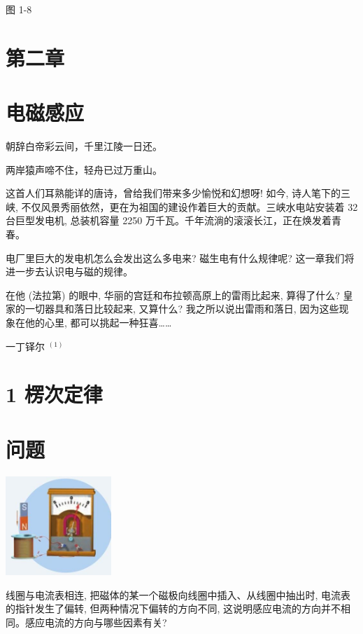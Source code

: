 \documentclass[10pt]{article}
\begin{document}
图 1-8

\section*{第二章}

\section*{电磁感应}

朝辞白帝彩云间，千里江陵一日还。

两岸猿声啼不住，轻舟已过万重山。

这首人们耳熟能详的唐诗，曾给我们带来多少愉悦和幻想呀! 如今, 诗人笔下的三峡, 不仅风景秀丽依然，更在为祖国的建设作着巨大的贡献。三峡水电站安装着 32 台巨型发电机, 总装机容量 2250 万千瓦。千年流淌的滚滚长江，正在焕发着青春。

电厂里巨大的发电机怎么会发出这么多电来? 磁生电有什么规律呢? 这一章我们将进一步去认识电与磁的规律。

在他 (法拉第) 的眼中, 华丽的宫廷和布拉顿高原上的雷雨比起来, 算得了什么? 皇家的一切器具和落日比较起来, 又算什么? 我之所以说出雷雨和落日, 因为这些现象在他的心里, 都可以挑起一种狂喜……

一丁铎尔 \({}^{\left( 1\right) }\)

\section*{1 楞次定律}

\section*{问题}

\begin{center}
\includegraphics[max width=0.3\textwidth]{images/01910e72-c5b7-7ed5-a6d4-fb3a5faefc32_29_377489.jpg}
\end{center}

线圈与电流表相连, 把磁体的某一个磁极向线圈中插入、从线圈中抽出时, 电流表的指针发生了偏转, 但两种情况下偏转的方向不同, 这说明感应电流的方向并不相同。感应电流的方向与哪些因素有关?
\end{document}

